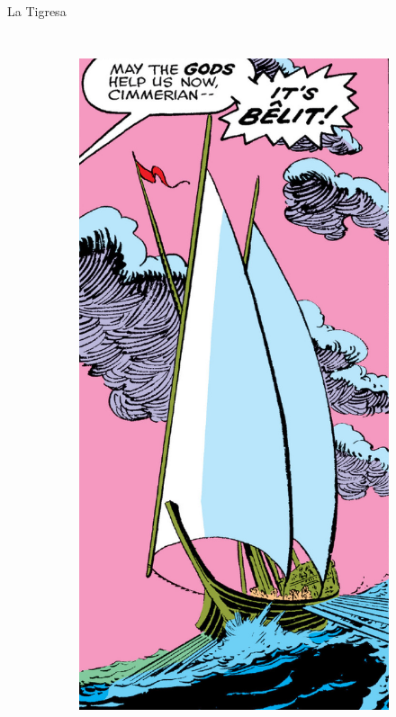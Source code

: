 \begin{frame}{La Tigresa}
\begin{columns}
\begin{figure}[htp]
\begin{subfigure}[b]{0.25\textwidth}
				\includegraphics[width=\textwidth]{img/tigresa/CTB}
			\end{subfigure}
		    ~
			\begin{subfigure}[b]{0.2\textwidth}

\end{subfigure}
\end{figure}
\end{columns}
\end{frame}
